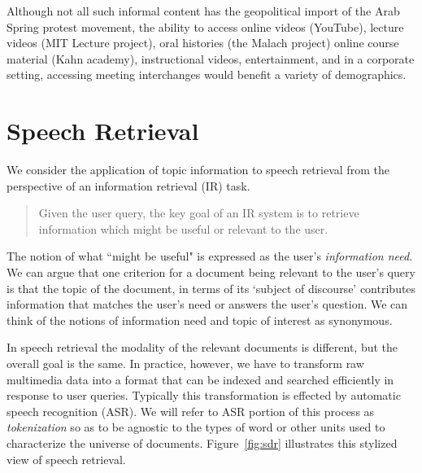 \noindent Although not all such informal content has the geopolitical import of the Arab Spring protest movement, the ability to access online videos (YouTube), lecture videos (MIT Lecture project), oral histories (the Malach project) online course material (Kahn academy), instructional videos, entertainment, and in a corporate setting, accessing meeting interchanges would benefit a variety of demographics.


\section{Speech Retrieval}


We consider the application of topic information to speech retrieval from the perspective of an information retrieval (IR) task.  

 \begin{quote} 
   Given the user query, the key goal of an IR system is to retrieve information which might be useful or relevant to the user.  \cite{baezaYates1999}
 \end{quote}
 
\noindent The notion of what ``might be useful" is expressed as the user's \textit{information need}.  We can argue that one criterion for a document being relevant to the user's query is that the topic of the document, in terms of its `subject of discourse' contributes information that matches the user's need or answers the user's question.  We can think of the notions of information need and topic of interest as synonymous.

In speech retrieval the modality of the relevant documents is different, but the overall goal is the same.  In practice, however, we have to transform raw multimedia data into a format that can be indexed and searched efficiently in response to user queries.  Typically this transformation is effected by automatic speech recognition (ASR).  We will refer to ASR portion of this process as \textit{tokenization} so as to be agnostic to the types of word or other units used to characterize the universe of documents.  Figure~\ref{fig:sdr} illustrates this stylized view of speech retrieval.  

